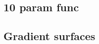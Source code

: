 \documentclass[9pt]{article}
\begin{document}
\subsection{10 param func}%
\label{sub:10_param_func}


% 
% 


\subsection{Gradient surfaces}%
\label{sub:gradient_surfaces}
%   



\end{document}
